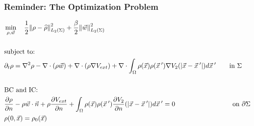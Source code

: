 \documentclass[aspectratio=169,xcolor=dvipsnames]{beamer}
\begin{document}
\begin{frame}
	\frametitle{Reminder: The Optimization Problem}
	
	
	\begin{align*}
		&\min_{\rho,\vec{w}} \quad \frac{1}{2}\norm{\rho- \widehat{\rho}}_{L_2(\Sigma)}^2 + \frac{\beta}{2} \norm{\vec{w}}_{L_2(\Sigma)}^2\\
		\\
		&\text{subject to:}
		\\
		& \partial_t \rho = \nabla^2 \rho - \nabla \cdot (\rho \vec{w}) + \nabla \cdot \left(\rho \nabla V_{ext}\right)+\nabla \cdot \int_\Omega \rho(\vec{x}) \rho(\vec{x}\hspace{0.2em}') \nabla V_2(|\vec{x}-\vec{x}\hspace{0.2em}'|)d\vec{x}\hspace{0.2em}' \qquad { \text{in    } \Sigma}\\
		\\
		&{\text{BC } \text{and IC:}}\\
		&\frac{\partial \rho}{\partial n} - \rho \vec{w} \cdot \vec{n} + 	\rho \frac{\partial V_{ext}}{\partial n} +   \int_\Omega \rho(\vec{x}) \rho(\vec{x}\hspace{0.2em}')  \frac{ \partial  V_2}{\partial n}(|\vec{x}-\vec{x}\hspace{0.2em}'|)d\vec{x}\hspace{0.2em}'= 0 \quad \ \ \qquad \qquad \qquad \quad \text{on   } \partial \Sigma   \\
		&{\rho(0,\vec{x}) = \rho_0(\vec{x})} 
	\end{align*}
\end{frame}
\end{document}

